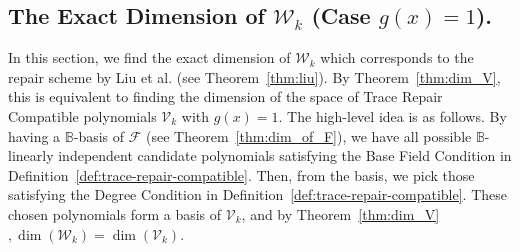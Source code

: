\documentclass[onecolumn]{IEEEtran}
\theoremstyle{plain}
\theoremstyle{definition}
\newcommand{\BB}{\mathbb{B}}
\newcommand{\cF}{\mathcal{F}}
\newcommand{\cW}{\mathcal{W}}
\newcommand{\cV}{\mathcal{V}}
\begin{document}
\subsection{The Exact Dimension of $\cW_k$ (Case $g(x) = 1$).}\label{sec:basis_of_W}
In this section, we find the exact dimension of $\cW_k$ which corresponds to the repair scheme by Liu et al. (see Theorem~\ref{thm:liu}). By Theorem~\ref{thm:dim_V}, this is equivalent to finding the dimension of the space of Trace Repair Compatible polynomials $\cV_k$ with $g(x) = 1$. The high-level idea is as follows. By having a $\BB$-basis of $\cF$ (see Theorem~\ref{thm:dim_of_F}), we have all possible $\BB$-linearly independent candidate polynomials satisfying the Base Field Condition in Definition~\ref{def:trace-repair-compatible}. Then, from the basis, we pick those satisfying the Degree Condition in Definition~\ref{def:trace-repair-compatible}. These chosen polynomials form a basis of $\cV_k$, and by Theorem~\ref{thm:dim_V}$, \dim(\cW_k) = \dim(\cV_k)$.
\end{document}
